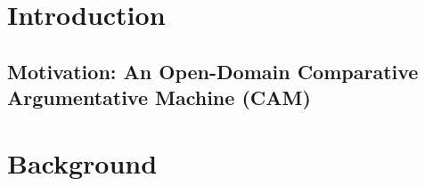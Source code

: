 \chapter{Introduction}

\section{Motivation: An Open-Domain Comparative Argumentative Machine (CAM)}

%
%
%



\chapter{Background}

